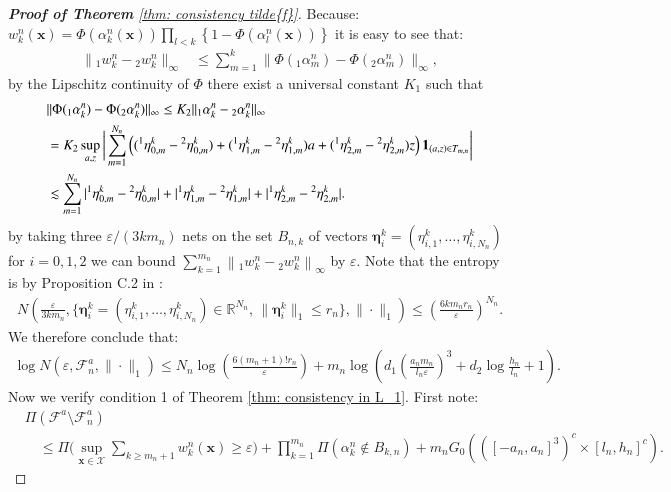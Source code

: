 \begin{proof}[\hypertarget{proof of thm consistency f tilde}{\textbf{Proof of Theorem}} \ref{thm: consistency tilde{f}}]
    Because: $w_k^n(\boldsymbol{x}) = \Phi(\alpha_k^n(\boldsymbol{x})) \prod_{l<k} \left\{ 1- \Phi(\alpha_l^n(\boldsymbol{x}))\right\}$ it is easy to see that:
    \begin{align*}
        \| {}_{1}w^n_k - {}_{2}w^n_k \|_{\infty} &\leq \sum_{m=1}^{k}\|\Phi({}_{1}\alpha_m^n) -\Phi({}_{2}\alpha_m^n)  \|_{\infty},
    \end{align*}
    by the Lipschitz continuity of $\Phi$ there exist a universal constant $K_1$ such that 
    \begin{align*}
        &\|\Phi({}_{1}\alpha_k^n) -\Phi({}_{2}\alpha_k^n)  \|_{\infty} \leq  K_2 \| {}_{1}\alpha_k^n - {}_{2}\alpha_k^n  \|_{\infty} \\
        &= K_2 \sup_{a,z} \bigg| \sum_{m=1}^{N_n}\left(({}^{1}\eta_{0, m}^k - {}^{2}\eta_{0, m}^k)+({}^{1}\eta_{1, m}^k -{}^{2}\eta_{1, m}^k ) a+({}^{1}\eta_{2, m}^k -{}^{2}\eta_{2, m}^k) z\right) \mathbf{1}_{(a, z) \in T_{m, n}}  \bigg| \\
        &\lesssim \sum_{m=1}^{N_n} |{}^{1}\eta_{0, m}^k - {}^{2}\eta_{0, m}^k| +|{}^{1}\eta_{1, m}^k -{}^{2}\eta_{1, m}^k | + |{}^{1}\eta_{2, m}^k -{}^{2}\eta_{2, m}^k|. 
    \end{align*}
    by taking three $\varepsilon/(3 k m_n)$ nets on the set $B_{n,k}$ of vectors $\boldsymbol{\eta}_i^k = (\eta_{i,1}^k, \ldots, \eta_{i,N_n}^k)$ for $i=0,1,2$ we can bound $\sum_{k=1}^{m_n}\left\|{}_{1}w^n_k - {}_{2}w^n_k \right\|_\infty$ by $\varepsilon$. Note that the entropy is by Proposition C.2 in \cite{4}:
    \begin{align*}
        N\left( \frac{\varepsilon}{3 k m_n}, \{ \boldsymbol{\eta}_i^k = (\eta_{i,1}^k, \ldots, \eta_{i,N_n}^k) \in \mathbb{R}^{N_n}, \, \| \boldsymbol{\eta}_i^k  \|_1 \leq r_n \}, \| \cdot \|_1 \right) \leq \left(  \frac{6k m_n r_n}{ \varepsilon}\right)^{N_n}.
    \end{align*}
    We therefore conclude that:
    \begin{align*}
    \log N \left( \varepsilon, \mathcal{F}^a_n, \| \cdot \|_1 \right) \leq  N_n \log \left( \frac{6 (m_n+1)! r_n}{\varepsilon} \right) + m_n \log \left( d_1\left(\frac{a_n m_n}{l_n \varepsilon}\right)^3+d_2 \log \frac{h_n}{l_n}+1 \right).
    \end{align*}
    Now we verify condition 1 of Theorem \ref{thm: consistency in L_1}. First note:
    \begin{align*}
        &\Pi \left(  \mathcal{F}^a \setminus \mathcal{F}^a_n\right) \\
        &\quad \leq \Pi \bigg( \sup _{\boldsymbol{x} \in \mathcal{X}} \sum_{k \geq m_n+1} w^n_k(\boldsymbol{x}) \geq \varepsilon \bigg) + \prod_{k=1}^{m_n} \Pi( \alpha^n_k \notin B_{k, n} ) + m_n G_0 \left(([-a_n,a_n]^3)^c \times [l_n,h_n]^c\right).

\end{align*}
\end{proof}
